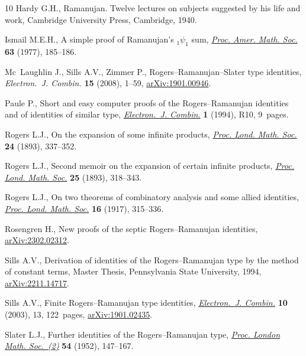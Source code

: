\documentclass[pdftex]{sigma}
\numberwithin{equation}{section}
\begin{document}
\begin{thebibliography}{10}
Hardy G.H., Ramanujan. {T}welve lectures on subjects suggested by his life and
 work, Cambridge University Press, Cambridge, 1940.

Ismail M.E.H., A simple proof of {R}amanujan's {$_{1}\psi_{1}$} sum,
 \href{https://doi.org/10.2307/2041093}{\textit{Proc. Amer. Math. Soc.}} \textbf{63} (1977), 185--186.

Mc~Laughlin J., Sills A.V., Zimmer P., Rogers--{R}amanujan--{S}later type
 identities, \textit{Electron.~J. Combin.} \textbf{15} (2008), 1--59,
 \href{https://arxiv.org/abs/1901.00946}{arXiv:1901.00946}.

Paule P., Short and easy computer proofs of the {R}ogers--{R}amanujan
 identities and of identities of similar type, \href{https://doi.org/10.37236/1190}{\textit{Electron.~J. Combin.}}
 \textbf{1} (1994), R10, 9~pages.

Rogers L.J., On the expansion of some infinite products, \href{https://doi.org/10.1112/plms/s1-24.1.337}{\textit{Proc. Lond.
 Math. Soc.}} \textbf{24} (1893), 337--352.

Rogers L.J., Second memoir on the expansion of certain infinite products,
 \href{https://doi.org/10.1112/plms/s1-25.1.318}{\textit{Proc. Lond. Math. Soc.}} \textbf{25} (1893), 318--343.

Rogers L.J., On two theorems of combinatory analysis and some allied
 identities, \href{https://doi.org/10.1112/plms/s2-16.1.315}{\textit{Proc. Lond. Math. Soc.}} \textbf{16} (1917), 315--336.

Rosengren H., New proofs of the septic {R}ogers--{R}amanujan identities,
 \href{https://arxiv.org/abs/2302.02312}{arXiv:2302.02312}.

Sills A.V., Derivation of identities of the {R}ogers--{R}amanujan type by the
 method of constant terms, {M}aster {T}hesis, {P}ennsylvania {S}tate
 {U}niversity, 1994, \href{https://arxiv.org/abs/2211.14717}{arXiv:2211.14717}.

Sills A.V., Finite {R}ogers--{R}amanujan type identities, \href{https://doi.org/10.37236/1706}{\textit{Electron.~J.
 Combin.}} \textbf{10} (2003), 13, 122~pages, \href{https://arxiv.org/abs/1901.02435}{arXiv:1901.02435}.

Slater L.J., Further identities of the {R}ogers--{R}amanujan type,
 \href{https://doi.org/10.1112/plms/s2-54.2.147}{\textit{Proc. London Math. Soc.~(2)}} \textbf{54} (1952), 147--167.


\end{thebibliography}
\end{document}
